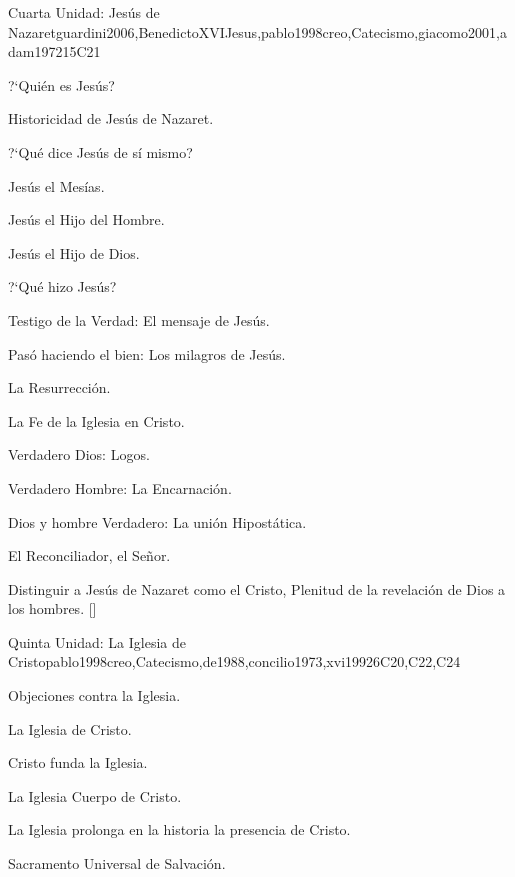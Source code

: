\begin{syllabus}
\begin{unit}{}{Cuarta Unidad: Jesús de Nazaret}{guardini2006,BenedictoXVIJesus,pablo1998creo,Catecismo,giacomo2001,adam1972}{15}{C21}
\begin{topics}
	\item ?`Quién es Jesús?
	    \begin{subtopics}
		  \item Historicidad de Jesús de Nazaret.
	    \end{subtopics}
	\item ?`Qué dice Jesús de sí mismo?
	    \begin{subtopics}
		\item Jesús el Mesías.
		\item Jesús el Hijo del Hombre.
		\item Jesús el Hijo de Dios.
	    \end{subtopics}
	\item ?`Qué hizo Jesús?
	    \begin{subtopics}
		\item Testigo de la Verdad: El mensaje de Jesús.
		\item Pasó haciendo el bien: Los milagros de Jesús.
		\item La Resurrección.
	    \end{subtopics}
	\item La Fe de la Iglesia en Cristo.
	    \begin{subtopics}
		\item Verdadero Dios: Logos.
		\item Verdadero Hombre: La Encarnación.
		\item Dios y hombre Verdadero: La unión Hipostática.
		\item El Reconciliador, el Señor.
	    \end{subtopics}

\end{topics}
\begin{learningoutcomes}
	\item Distinguir a Jesús de Nazaret como el Cristo, Plenitud de la revelación de Dios a los hombres. [\Familiarity]
\end{learningoutcomes}
\end{unit}

\begin{unit}{}{Quinta Unidad: La Iglesia de Cristo}{pablo1998creo,Catecismo,de1988,concilio1973,xvi1992}{6}{C20,C22,C24}
\begin{topics}
	\item Objeciones contra la Iglesia.
	\item La Iglesia de Cristo.
	    \begin{subtopics}
		\item Cristo funda la Iglesia.
		\item La Iglesia Cuerpo de Cristo.
		\item La Iglesia prolonga en la historia la presencia de Cristo.
		\item Sacramento Universal de Salvación.
	    \end{subtopics}


\end{topics}
\end{unit}
\end{syllabus}
